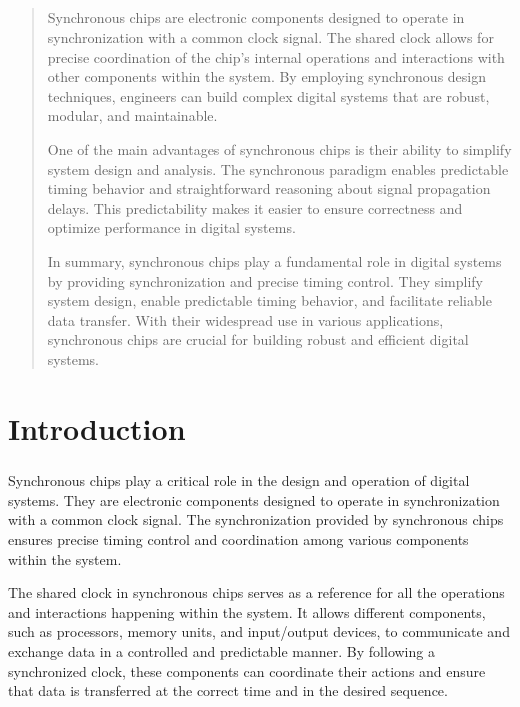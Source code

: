 \documentclass[a4paper,11pt]{report}
\newcommand{\textform}[1]{\fontsize{14}{20}\selectfont{#1}}
\begin{document}
\thispagestyle{empty}
  \renewcommand\abstractname{\textform{\textbf{ABSTRACT}}}
    \begin{abstract}
      \vspace{1.0cm}

 \paragraph{ }Synchronous chips are electronic components designed to operate in synchronization with a common clock signal. The shared clock allows for precise coordination of the chip's internal operations and interactions with other components within the system. By employing synchronous design techniques, engineers can build complex digital systems that are robust, modular, and maintainable.

One of the main advantages of synchronous chips is their ability to simplify system design and analysis. The synchronous paradigm enables predictable timing behavior and straightforward reasoning about signal propagation delays. This predictability makes it easier to ensure correctness and optimize performance in digital systems.

In summary, synchronous chips play a fundamental role in digital systems by providing synchronization and precise timing control. They simplify system design, enable predictable timing behavior, and facilitate reliable data transfer. With their widespread use in various applications, synchronous chips are crucial for building robust and efficient digital systems.
\end{abstract}

  \tableofcontents
\thispagestyle{empty}

\chapter{Introduction}

\paragraph{}Synchronous chips play a critical role in the design and operation of digital systems. They are electronic components designed to operate in synchronization with a common clock signal. The synchronization provided by synchronous chips ensures precise timing control and coordination among various components within the system.

The shared clock in synchronous chips serves as a reference for all the operations and interactions happening within the system. It allows different components, such as processors, memory units, and input/output devices, to communicate and exchange data in a controlled and predictable manner. By following a synchronized clock, these components can coordinate their actions and ensure that data is transferred at the correct time and in the desired sequence.
\end{document}
